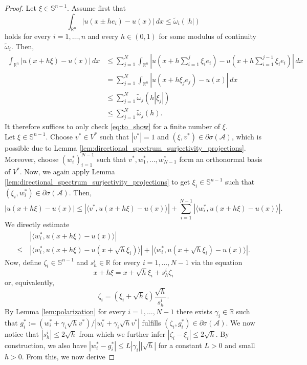 \documentclass[11pt,reqno]{amsart}
\theoremstyle{plain}
\theoremstyle{definition}
\theoremstyle{remark}
\numberwithin{equation}{section}
\newcommand{\R}{\mathbb{R}}
\newcommand{\s}{\mathbb{S}}
\newcommand{\A}{\mathcal{A}}
\newcommand{\1}{\mathbbm{1}} %
\begin{document}
\begin{proof}
    Let $\xi \in \s^{n-1}$. Assume first that  
    \[
        \int_{\R^n} |u(x \pm h e_i)- u(x)| \, dx \leq \tilde \omega_i(|h|)
    \]
    holds for every $i = 1,\ldots, n$ and every $h \in (0,1)$ for some modulus of continuity $\tilde \omega_i$.
    Then,
    \begin{align}
    \label{eq:to_show_2}
        \int_{\R^n} |u(x + h \xi) - u(x)| \, dx 
        &\leq \sum_{j = 1}^N \int_{\R^n} \left|u \left(x + h\sum_{i = 1}^j \xi_i e_i \right) - u \left(x + h\sum_{i = 1}^{j -1} \xi_i e_i \right) \right| \, dx \nonumber \\
        &= \sum_{j = 1}^N \int_{\R^n} |u(x + h\xi_j e_j) - u(x)| \, dx  \nonumber \\
        &\leq \sum_{j = 1}^N \tilde \omega_j(h|\xi_j|)  \nonumber \\
        &\leq \sum_{j = 1}^N \tilde \omega_j(h).
    \end{align}
    It therefore suffices to only check \eqref{eq:to_show} for a finite number of $\xi$.
    \\
    Let $\xi \in \s^{n-1}$. Choose $v^* \in V^*$ such that $|v^*| = 1$ and $(\xi, v^*) \in \partial \sigma (\A)$, which is possible due to Lemma \ref{lem:directional_spectrum_surjectivity_projections}. Moreover, choose $(w_i^*)_{i = 1}^{N-1}$ such that $v^*, w_1^*, ..., w_{N - 1}^*$ form an orthonormal basis of $V^*$. Now, we again apply Lemma \ref{lem:directional_spectrum_surjectivity_projections} to get $\xi_{i} \in \s^{n-1}$ such that $(\xi_i, w_i^*) \in \partial \sigma(\A)$. Then,
    \[
        |u(x + h\xi) - u(x)| \leq |\langle v^*, u(x + h\xi) - u(x) \rangle| + \sum_{i = 1}^{N - 1}|\langle w_i^*,u(x + h\xi) - u(x)\rangle |.
    \]
    We directly estimate 
    \begin{align*}
        &|\langle w_i^*, u(x + h\xi) - u(x)\rangle| \\
        \leq ~ & |\langle w_i^*, u(x + h\xi) - u(x + \sqrt h \xi_{i})\rangle| + |\langle w_i^*, u(x + \sqrt h \xi_{i}) - u(x)\rangle|.
    \end{align*}
    Now, define $\zeta_i \in \s^{n-1}$ and $s_h^i \in \R$ for every $i = 1, \ldots, N-1$ via the equation
    \[
        x + h\xi = x + \sqrt h \xi_{i} + s_h^i \zeta_{i}
    \]
    or, equivalently,
    \[
        \zeta_i = (\xi_i + \sqrt h \xi)\frac{\sqrt h}{s_h^i}.
    \]
    By Lemma \ref{lem:polarization} for every $i = 1, \ldots, N-1$ there exists $\gamma_i \in \R$ such that $g_i^* := (w_i^* + \gamma_i \sqrt h v^*)/|w_i^* + \gamma_i \sqrt h v^*|$ fulfills $(\zeta_i, g_i^*) \in \partial \sigma(\A)$. We now notice that $|s_h^i| \leq 2\sqrt h$ from which we further infer $|\zeta_i - \xi_i| \leq 2\sqrt h$. By construction, we also have $|w^*_i - g^*_i| \leq L|\gamma_i||\sqrt h|$ for a constant $L > 0$ and small $h > 0$. From this, we now derive  

\end{proof}
\end{document}
